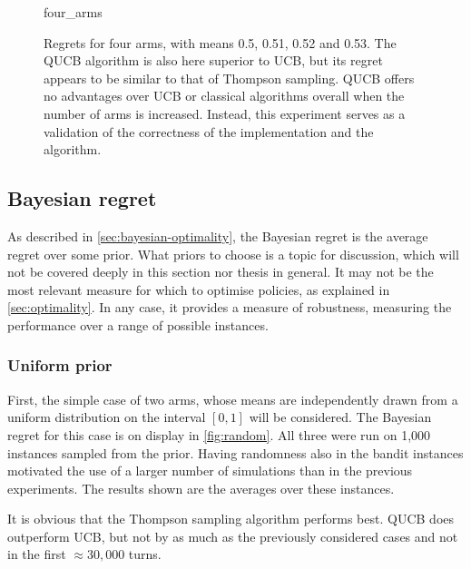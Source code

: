 \begin{figure}
    \centering
    \newcommand{\myoptions}{
        width=10cm,
        height=8cm,
        xlabel={Kiloturn},
        ylabel={Regret},
        legend entries={UCB, QUCB, Thompson},
        legend pos=north west,
        legend cell align=left,
        mystyle,
    }
    {four_arms}
    \caption[
        Regrets for four arms, with means 0.5, 0.51, 0.52 and 0.53.
    ]
    {
        Regrets for four arms, with means 0.5, 0.51, 0.52 and 0.53.
        The QUCB algorithm is also here superior to UCB, but its regret appears to be similar to that of Thompson sampling.
        QUCB offers no advantages over UCB or classical algorithms overall when the number of arms is increased.
        Instead, this experiment serves as a validation of the correctness of the implementation and the algorithm.
    }
    \label{fig:four_arms}
\end{figure}

\clearpage
\subsection{Bayesian regret}
\label{sec:results_bayesian}
As described in \cref{sec:bayesian-optimality}, the Bayesian regret is the average regret over some prior.
What priors to choose is a topic for discussion, which will not be covered deeply in this section nor thesis in general.
It may not be the most relevant measure for which to optimise policies, as explained in \cref{sec:optimality}.
In any case, it provides a measure of robustness, measuring the performance over a range of possible instances.

\subsubsection{Uniform prior}
First, the simple case of two arms, whose means are independently drawn from a uniform distribution on the interval $[0, 1]$ will be considered.
The Bayesian regret for this case is on display in \cref{fig:random}.
All three were run on 1,000 instances sampled from the prior.
Having randomness also in the bandit instances motivated the use of a larger number of simulations than in the previous experiments.
The results shown are the averages over these instances.

It is obvious that the Thompson sampling algorithm performs best.
QUCB does outperform UCB, but not by as much as the previously considered cases and not in the first $\approx 30,000$ turns.

